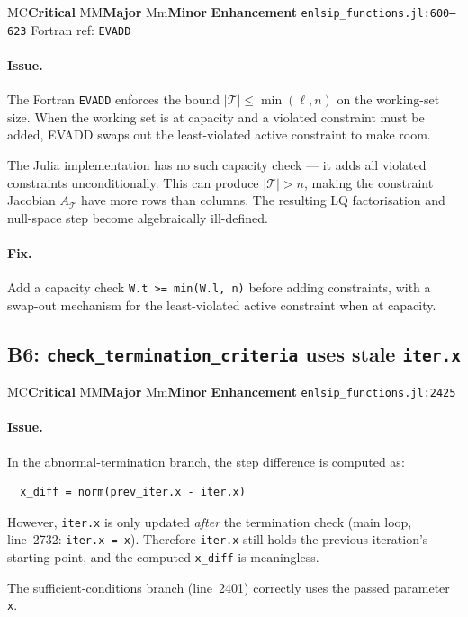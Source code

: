 \documentclass[11pt, a4paper]{article}
\newcommand{\fortranref}[1]{\texttt{#1}}
\newcommand{\juliaref}[2]{\texttt{#1:#2}}
\newcommand{\severity}[1]{%
  \ifx#1C\colorbox{red!20}{\textbf{Critical}}%
  \else\ifx#1M\colorbox{orange!20}{\textbf{Major}}%
  \else\ifx#1m\colorbox{yellow!20}{\textbf{Minor}}%
  \else\colorbox{blue!10}{\textbf{Enhancement}}%
  \fi\fi\fi%
}
\begin{document}
\severity{M} \quad \juliaref{enlsip\_functions.jl}{600--623}
\quad Fortran ref: \fortranref{EVADD}

\paragraph{Issue.}
The Fortran \fortranref{EVADD} enforces the bound
$|\mathcal{T}| \leq \min(\ell, n)$ on the working-set size.  When the
working set is at capacity and a violated constraint must be added,
EVADD swaps out the least-violated active constraint to make room.

The Julia implementation has no such capacity check --- it adds all
violated constraints unconditionally.  This can produce $|\mathcal{T}| > n$,
making the constraint Jacobian $A_{\mathcal{T}}$ have more rows than columns.
The resulting LQ factorisation and null-space step become algebraically
ill-defined.

\paragraph{Fix.}
Add a capacity check \texttt{W.t >= min(W.l, n)} before adding constraints,
with a swap-out mechanism for the least-violated active constraint when at capacity.

\subsection{B6: \texttt{check\_termination\_criteria} uses stale \texttt{iter.x}}
\label{sec:b6}

\severity{M} \quad \juliaref{enlsip\_functions.jl}{2425}

\paragraph{Issue.}
In the abnormal-termination branch, the step difference is computed as:
\begin{lstlisting}
  x_diff = norm(prev_iter.x - iter.x)
\end{lstlisting}
However, \texttt{iter.x} is only updated \emph{after} the termination
check (main loop, line~2732: \texttt{iter.x = x}).  Therefore
\texttt{iter.x} still holds the previous iteration's starting point,
and the computed \texttt{x\_diff} is meaningless.

The sufficient-conditions branch (line~2401) correctly uses the passed
parameter \texttt{x}.
\end{document}
